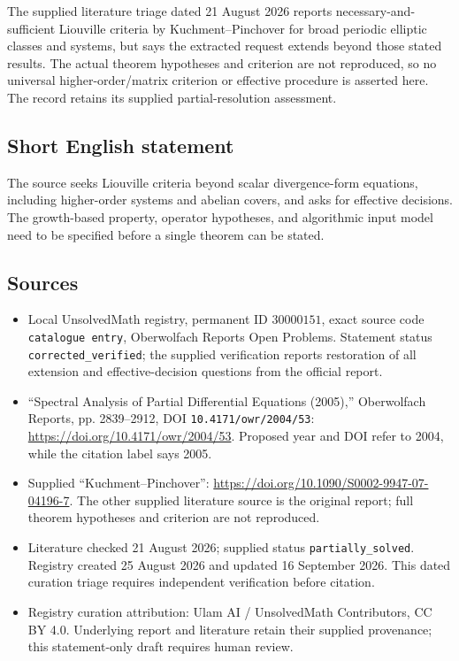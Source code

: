 \documentclass[11pt]{article}
\begin{document}
The supplied literature triage dated 21 August 2026 reports necessary-and-sufficient Liouville criteria by Kuchment--Pinchover for broad periodic elliptic classes and systems, but says the extracted request extends beyond those stated results. The actual theorem hypotheses and criterion are not reproduced, so no universal higher-order/matrix criterion or effective procedure is asserted here. The record retains its supplied partial-resolution assessment.
\subsection{Short English statement}
The source seeks Liouville criteria beyond scalar divergence-form equations, including higher-order systems and abelian covers, and asks for effective decisions. The growth-based property, operator hypotheses, and algorithmic input model need to be specified before a single theorem can be stated.
\subsection{Sources}
\begin{itemize}
\item Local UnsolvedMath registry, permanent ID \(30000151\), exact source code \texttt{catalogue entry}, Oberwolfach Reports Open Problems. Statement status \texttt{corrected\_verified}; the supplied verification reports restoration of all extension and effective-decision questions from the official report.
\item ``Spectral Analysis of Partial Differential Equations (2005),'' Oberwolfach Reports, pp. 2839--2912, DOI \texttt{10.4171/owr/2004/53}: \url{https://doi.org/10.4171/owr/2004/53}. Proposed year and DOI refer to 2004, while the citation label says 2005.
\item Supplied ``Kuchment--Pinchover'': \url{https://doi.org/10.1090/S0002-9947-07-04196-7}. The other supplied literature source is the original report; full theorem hypotheses and criterion are not reproduced.
\item Literature checked 21 August 2026; supplied status \texttt{partially\_solved}. Registry created 25 August 2026 and updated 16 September 2026. This dated curation triage requires independent verification before citation.
\item Registry curation attribution: Ulam AI / UnsolvedMath Contributors, CC BY 4.0. Underlying report and literature retain their supplied provenance; this statement-only draft requires human review.
\end{itemize}
\end{document}
